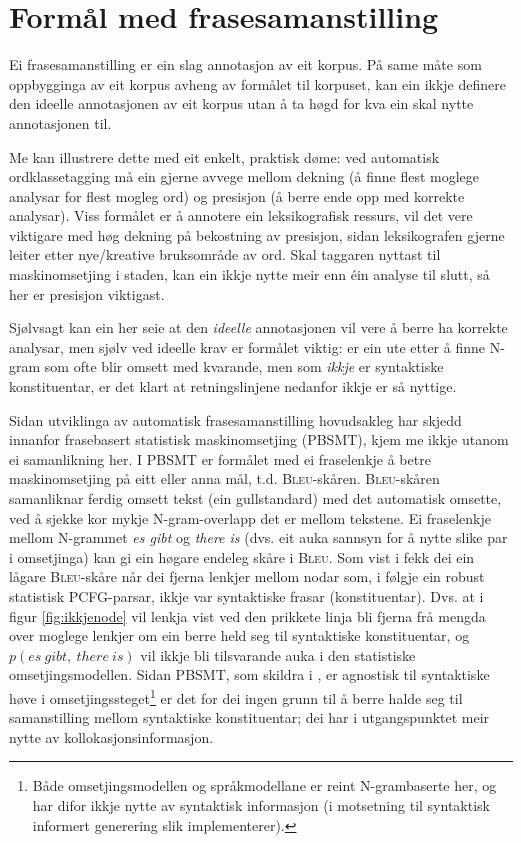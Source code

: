 \documentclass[11pt,a4paper,oneside,draft]{book}
\newcommand{\Bleu}{\textsc{Bleu}}
\begin{document}
\section{Formål med frasesamanstilling}
\label{sec-3.2}

Ei frasesamanstilling er ein slag annotasjon av eit korpus. På same
måte som oppbygginga av eit korpus avheng av formålet til korpuset,
kan ein ikkje definere den ideelle annotasjonen av eit korpus utan å
ta høgd for kva ein skal nytte annotasjonen til.

Me kan illustrere dette med eit enkelt, praktisk døme: ved automatisk
ordklassetagging må ein gjerne avvege mellom dekning (å finne flest
moglege analysar for flest mogleg ord) og presisjon (å berre ende opp
med korrekte analysar).  Viss formålet er å annotere ein
leksikografisk ressurs, vil det vere viktigare med høg dekning på
bekostning av presisjon, sidan leksikografen gjerne leiter etter
nye/kreative bruksområde av ord. Skal taggaren nyttast til
maskinomsetjing i staden, kan ein ikkje nytte meir enn éin analyse til
slutt, så her er presisjon viktigast.

Sjølvsagt kan ein her seie at den \emph{ideelle} annotasjonen vil vere å
berre ha korrekte analysar, men sjølv ved ideelle krav er formålet
viktig: er ein ute etter å finne N-gram som ofte blir omsett med
kvarande, men som \emph{ikkje} er syntaktiske konstituentar, er det klart
at retningslinjene nedanfor ikkje er så nyttige.

Sidan utviklinga av automatisk frasesamanstilling hovudsakleg har
skjedd innanfor frasebasert statistisk maskinomsetjing (PBSMT), kjem
me ikkje utanom ei samanlikning her. I PBSMT er formålet med ei
fraselenkje å betre maskinomsetjing på eitt eller anna mål,
t.d. \Bleu-skåren. \Bleu-skåren samanliknar ferdig omsett tekst (ein
gullstandard) med det automatisk omsette, ved å sjekke kor mykje
N-gram-overlapp det er mellom tekstene. Ei fraselenkje mellom
N-grammet \emph{es gibt} og \emph{there is} (dvs. eit auka sannsyn for å nytte
slike par i omsetjinga) kan gi ein høgare endeleg skåre i \Bleu. Som
vist i \citet{koehn2003spb} fekk dei ein lågare \Bleu-skåre når dei
  fjerna lenkjer mellom nodar som, i følgje ein robust
statistisk PCFG-parsar, ikkje var syntaktiske frasar
(konstituentar). Dvs. at i figur \ref{fig:ikkjenode} vil lenkja vist
ved den prikkete linja bli fjerna frå mengda over moglege lenkjer om
ein berre held seg til syntaktiske konstituentar, og
$p(es~gibt,~there~is)$ vil ikkje bli tilsvarande auka i den
statistiske omsetjingsmodellen. Sidan PBSMT, som skildra i
\citet{koehn2003spb}, er agnostisk til syntaktiske høve i
omsetjingssteget\footnote{Både omsetjingsmodellen og
språkmodellane er reint N-grambaserte her, og har difor ikkje nytte av
syntaktisk informasjon (i motsetning til syntaktisk informert
generering slik \citet{riezler2006gmt} implementerer). } er det for dei ingen grunn til å berre halde
seg til samanstilling mellom syntaktiske konstituentar; dei har i
utgangspunktet meir nytte av kollokasjonsinformasjon.
\end{document}
